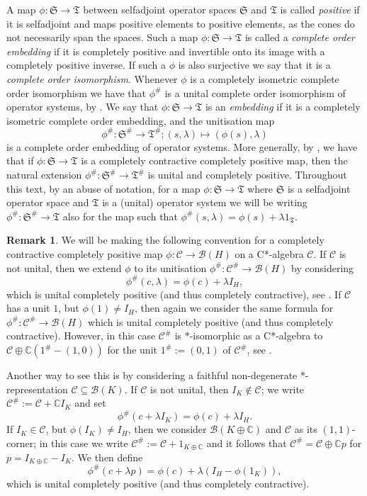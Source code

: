 \documentclass[11pt, draft]{amsart}
\numberwithin{equation}{section}
\theoremstyle{plain}
\theoremstyle{definition}
\newtheorem{remark}[theorem]{Remark}
\theoremstyle{remark}
\newcommand{\B}{{\mathcal{B}}}
\newcommand{\C}{{\mathcal{C}}}
\def\la{\lambda}
\newcommand{\bC}{\mathbb{C}}
\newcommand{\fS}{{\mathfrak{S}}}
\newcommand{\fT}{{\mathfrak{T}}}
\begin{document}
A map $\phi \colon \fS \to \fT$ between selfadjoint operator spaces $\fS$ and $\fT$ is called \emph{positive} if it is selfadjoint and maps positive elements to positive elements, as the cones do not necessarily span the spaces.
Such a map $\phi \colon \fS \to \fT$ is called a \emph{complete order embedding} if it is completely positive and invertible onto its image with a completely positive inverse. 
If such a $\phi$ is also surjective we say that it is a \emph{complete order isomorphism}.
Whenever $\phi$ is a completely isometric complete order isomorphism we have that $\phi^\#$ is a unital complete order isomorphism of operator systems, by \cite[Corollary 2.14]{CS21}. 
We say that $\phi\colon \fS \to \fT$ is an \emph{embedding} if it is a completely isometric complete order embedding, and the unitisation map
\[
\phi^\#\colon \fS^\#\to\fT^\#; (s,\la)\mapsto (\phi(s),\la)
\]
is a complete order embedding of operator systems.
More generally, by \cite[Lemma 4.9]{Wer02}, we have that if $\phi\colon \fS \to \fT$ is a completely contractive completely positive map, then the natural extension $\phi^{\#} \colon \fS^{\#} \to \fT^{\#}$ is unital and completely positive.
Throughout this text, by an abuse of notation, for a map $\phi\colon \fS\to \fT$ where $\fS$ is a selfadjoint operator space and $\fT$ is a (unital) operator system we will be writing $\phi^\#\colon \fS^\#\to \fT$ also for the map such that $\phi^\#(s,\la)=\phi(s)+\la 1_\fT$.

\begin{remark} \label{R:c* unit}
We will be making the following convention for a completely contractive completely positive map $\phi \colon \C \to \B(H)$ on a C*-algebra $\C$.
If $\C$ is not unital, then we extend $\phi$ to its unitisation $\phi^{\#} \colon \C^{\#} \to \B(H)$ by considering 
\[
\phi^{\#}(c,\la) = \phi(c) + \la I_H,
\]
which is unital completely positive (and thus completely contractive), see \cite[Proposition 2.2.1]{BO08}.
If $\C$ has a unit $1$, but $\phi(1) \neq I_H$, then again we consider the same formula for $\phi^{\#} \colon \C^{\#} \to \B(H)$ which is unital completely positive (and thus completely contractive).
However, in this case $\C^{\#}$ is $*$-isomorphic as a C*-algebra to $\C \oplus \bC(1^{\#} - (1,0))$ for the unit $1^{\#}:= (0, 1)$ of $\C^{\#}$, see \cite[Lemma 2.2.3]{BO08}.

Another way to see this is by considering a faithful non-degenerate $*$-representation $\C \subseteq \B(K)$.
If $\C$ is not unital, then $I_K \notin \C$; we write $\C^{\#} := \C + \bC I_K$ and set 
\[
\phi^{\#}(c +\la I_K) = \phi(c) + \la I_H.
\]
If $I_K \in \C$, but $\phi(I_K)\neq I_H$, then we consider $\B(K \oplus \bC)$ and $\C$ as its $(1,1)$-corner; in this case we write $\C^{\#} := \C + 1_{K \oplus \bC}$ and it follows that $\C^{\#} = \C \oplus \bC p$ for $p=I_{K \oplus \bC} - I_K$.
We then define
\[
\phi^{\#}(c + \la p) = \phi(c) + \la (I_H - \phi(1_K)),
\]
which is unital completely positive (and thus completely contractive).
\end{remark}
\end{document}
